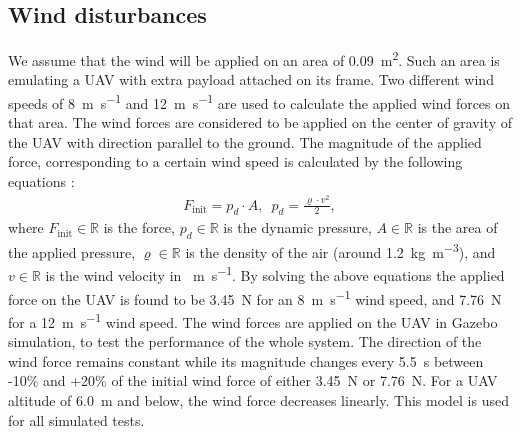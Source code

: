 \documentclass[conference]{IEEEtran}
\begin{document}
\subsection{Wind disturbances}
\label{sec:WindDisturbances}
We assume that the wind will be
applied on an area of \SI{0.09}{\m^2}. Such an area is emulating a UAV
with extra payload attached on its frame. Two different wind speeds of
\SI{8}{\m \per \s} and \SI{12}{\m \per \s} are used to calculate the applied wind forces
on that area. The wind forces are considered to be applied on the
center of gravity of the UAV with direction parallel to the ground. The magnitude of the applied force, corresponding to a certain wind
speed is calculated by the following equations
\cite{Dynamic_pressure_NASA,anderson2010fundamentals}:
\begin{equation}
    \begin{array}{l}
         F_{\textrm{init}} = p_{d} \cdot A,\,\,\,
         p_{d} = \frac{\varrho \cdot v^2}{2},
    \end{array}
\end{equation}
\noindent where $F_{\text{init}}\in\mathbb{R}$ is the force, \(p_{d}\in\mathbb{R}\) is the dynamic pressure, \(A\in\mathbb{R}\) is
the area of the applied pressure, \(\varrho\in\mathbb{R}\) is the density of the
air (around \SI{1.2}{\kg \per \m^3}), and \(v\in\mathbb{R}\) is the wind velocity in \SI{}{\m \per \s}. By solving the above equations the applied force on the UAV is found
to be \SI{3.45}{\newton} for an \SI{8}{\m \per \s} wind speed, and 
\SI{7.76}{\newton} for a \SI{12}{\m \per \s}
wind speed. The wind forces are applied on the UAV in Gazebo
simulation, to test the performance of the whole system. The direction of the wind force remains constant while its magnitude changes every \SI{5.5}{\second} between -10\% and +20\% of the initial wind force of either \SI{3.45}{\newton} or \SI{7.76}{\newton}. For a UAV altitude of \SI{6.0}{\meter} and below, the wind force decreases linearly. This model is used for all simulated tests.


%

\end{document}
